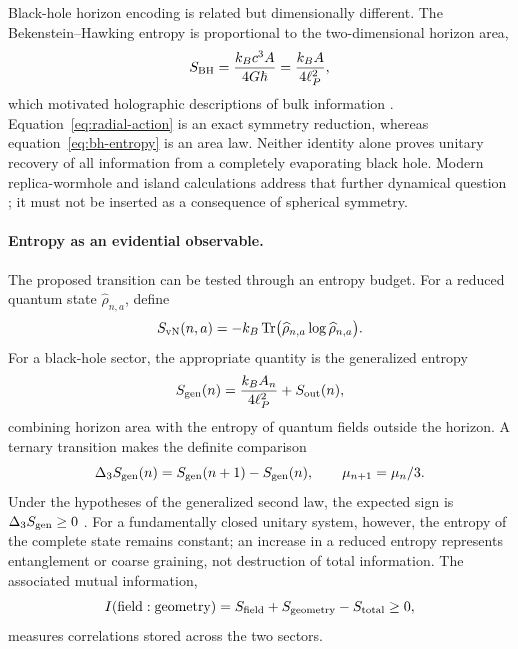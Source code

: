 \documentclass[11pt]{amsart}
\theoremstyle{definition}
\theoremstyle{remark}
\begin{document}
Black-hole horizon encoding is related but dimensionally different.  The Bekenstein--Hawking
entropy is proportional to the two-dimensional horizon area,
\begin{equation}\label{eq:bh-entropy}
  S_{\rm BH}=\frac{k_Bc^3A}{4G\hbar}=\frac{k_BA}{4\ell_P^2},
\end{equation}
which motivated holographic descriptions of bulk information
\cite{Bekenstein1973,Hawking1975,Susskind1995}.  Equation~\eqref{eq:radial-action} is an exact
symmetry reduction, whereas equation~\eqref{eq:bh-entropy} is an area law.  Neither identity alone
proves unitary recovery of all information from a completely evaporating black hole.  Modern
replica-wormhole and island calculations address that further dynamical question
\cite{Almheiri2020}; it must not be inserted as a consequence of spherical symmetry.

\paragraph{Entropy as an evidential observable.}
The proposed transition can be tested through an entropy budget.  For a reduced quantum state
$\widehat\rho_{n,a}$, define
\begin{equation}\label{eq:von-neumann-stratum}
  S_{\rm vN}(n,a)=-k_B\operatorname{Tr}
  \bigl(\widehat\rho_{n,a}\log\widehat\rho_{n,a}\bigr).
\end{equation}
For a black-hole sector, the appropriate quantity is the generalized entropy
\begin{equation}\label{eq:generalized-entropy}
  S_{\rm gen}(n)=\frac{k_BA_n}{4\ell_P^2}+S_{\rm out}(n),
\end{equation}
combining horizon area with the entropy of quantum fields outside the horizon.  A ternary
transition makes the definite comparison
\begin{equation}\label{eq:entropy-step}
  \Delta_3S_{\rm gen}(n)
  =S_{\rm gen}(n+1)-S_{\rm gen}(n),
  \qquad \mu_{n+1}=\mu_n/3.
\end{equation}
Under the hypotheses of the generalized second law, the expected sign is
$\Delta_3S_{\rm gen}\ge0$ \cite{Wall2012}.  For a fundamentally closed unitary system, however,
the entropy of the complete state remains constant; an increase in a reduced entropy represents
entanglement or coarse graining, not destruction of total information.  The associated mutual
information,
\begin{equation}\label{eq:mutual-information-link}
  I(\text{field}:\text{geometry})
  =S_{\rm field}+S_{\rm geometry}-S_{\rm total}\ge0,
\end{equation}
measures correlations stored across the two sectors.
\end{document}
